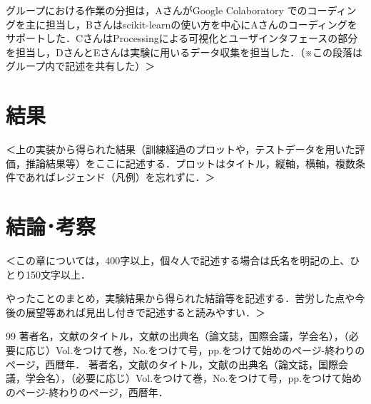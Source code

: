 \documentclass[11pt]{ujarticle} %
\begin{document}
グループにおける作業の分担は，AさんがGoogle Colaboratory でのコーディングを主に担当し，Bさんはscikit-learnの使い方を中心にAさんのコーディングをサポートした．CさんはProcessingによる可視化とユーザインタフェースの部分を担当し，DさんとEさんは実験に用いるデータ収集を担当した．（※この段落はグループ内で記述を共有した）＞

\section{結果}
＜上の実装から得られた結果（訓練経過のプロットや，テストデータを用いた評価，推論結果等）をここに記述する．プロットはタイトル，縦軸，横軸，複数条件であればレジェンド（凡例）を忘れずに．＞

\section{結論･考察}
＜この章については，400字以上，個々人で記述する場合は氏名を明記の上、ひとり150文字以上．

やったことのまとめ，実験結果から得られた結論等を記述する．苦労した点や今後の展望等あれば見出し付きで記述すると読みやすい．＞



\begin{thebibliography}{99}
  著者名，文献のタイトル，文献の出典名（論文誌，国際会議，学会名），（必要に応じ）Vol.をつけて巻，No.をつけて号，pp.をつけて始めのページ-終わりのページ，西暦年．
  著者名，文献のタイトル，文献の出典名（論文誌，国際会議，学会名），（必要に応じ）Vol.をつけて巻，No.をつけて号，pp.をつけて始めのページ-終わりのページ，西暦年．
\end{thebibliography}

\clearpage

\end{document}
